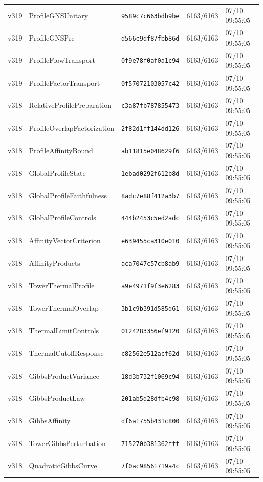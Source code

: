 \documentclass[11pt]{article}
\theoremstyle{definition}\newtheorem{deriv}{Derivação}
\begin{document}
{\begin{longtable}{@{}lllll@{}}
v319 & ProfileGNSUnitary & \texttt{9589c7c663bdb9be} & 6163/6163 & 07/10 09:55:05 \\
v319 & ProfileGNSPre & \texttt{d566c9df87fbb86d} & 6163/6163 & 07/10 09:55:05 \\
v319 & ProfileFlowTransport & \texttt{0f9e78f0af0a1c94} & 6163/6163 & 07/10 09:55:05 \\
v319 & ProfileFactorTransport & \texttt{0f57072103057c42} & 6163/6163 & 07/10 09:55:05 \\
v318 & RelativeProfilePreparation & \texttt{c3a87fb787855473} & 6163/6163 & 07/10 09:55:05 \\
v318 & ProfileOverlapFactorization & \texttt{2f82d1ff144dd126} & 6163/6163 & 07/10 09:55:05 \\
v318 & ProfileAffinityBound & \texttt{ab11815e048629f6} & 6163/6163 & 07/10 09:55:05 \\
v318 & GlobalProfileState & \texttt{1ebad0292f612b8d} & 6163/6163 & 07/10 09:55:05 \\
v318 & GlobalProfileFaithfulness & \texttt{8adc7e88f412a3b7} & 6163/6163 & 07/10 09:55:05 \\
v318 & GlobalProfileControls & \texttt{444b2453c5ed2adc} & 6163/6163 & 07/10 09:55:05 \\
v318 & AffinityVectorCriterion & \texttt{e639455ca310e010} & 6163/6163 & 07/10 09:55:05 \\
v318 & AffinityProducts & \texttt{aca7047c57cb8ab9} & 6163/6163 & 07/10 09:55:05 \\
v318 & TowerThermalProfile & \texttt{a9e4971f9f3e6283} & 6163/6163 & 07/10 09:55:05 \\
v318 & TowerThermalOverlap & \texttt{3b1c9b391d585d61} & 6163/6163 & 07/10 09:55:05 \\
v318 & ThermalLimitControls & \texttt{0124283356ef9120} & 6163/6163 & 07/10 09:55:05 \\
v318 & ThermalCutoffResponse & \texttt{c82562e512acf62d} & 6163/6163 & 07/10 09:55:05 \\
v318 & GibbsProductVariance & \texttt{18d3b732f1069c94} & 6163/6163 & 07/10 09:55:05 \\
v318 & GibbsProductLaw & \texttt{201ab5d28dfb4c98} & 6163/6163 & 07/10 09:55:05 \\
v318 & GibbsAffinity & \texttt{df6a1755b431c800} & 6163/6163 & 07/10 09:55:05 \\
v318 & TowerGibbsPerturbation & \texttt{715270b381362fff} & 6163/6163 & 07/10 09:55:05 \\
v318 & QuadraticGibbsCurve & \texttt{7f0ac98561719a4c} & 6163/6163 & 07/10 09:55:05 \\

\end{longtable}}
\end{document}
